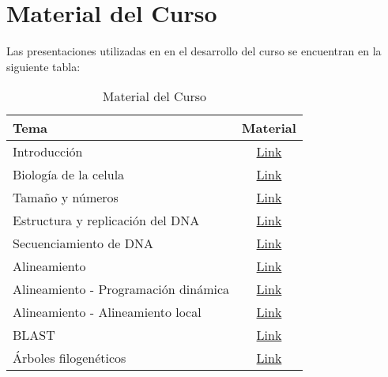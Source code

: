 \chapter{Material del Curso}
\newpage
\pagestyle{empty} %

Las presentaciones utilizadas en en el desarrollo del curso se encuentran en la siguiente tabla:

\begin{table}[h]
\centering
\begin{tabular}{l|c}
\hline
\textbf{Tema} & 
\textbf{Material} 
\\ \hline
Introducción &
\href{https://drive.google.com/drive/folders/18yP-CM04srt3JQ-4ImnSsoB3DI4GWFAp?usp=sharing}{Link}
\\ \hline
Biología de la celula &
 \href{https://drive.google.com/drive/folders/18yP-CM04srt3JQ-4ImnSsoB3DI4GWFAp?usp=sharing}{Link}
\\ \hline
Tamaño y números &
\href{https://drive.google.com/drive/folders/18yP-CM04srt3JQ-4ImnSsoB3DI4GWFAp?usp=sharing}{Link}
\\ \hline
Estructura y replicación del DNA &
\href{https://drive.google.com/drive/folders/18yP-CM04srt3JQ-4ImnSsoB3DI4GWFAp?usp=sharing}{Link}
\\ \hline
Secuenciamiento de DNA &
\href{https://drive.google.com/drive/folders/18yP-CM04srt3JQ-4ImnSsoB3DI4GWFAp?usp=sharing}{Link}
\\ \hline
Alineamiento &
\href{https://drive.google.com/drive/folders/18yP-CM04srt3JQ-4ImnSsoB3DI4GWFAp?usp=sharing}{Link}
\\ \hline
Alineamiento - Programación dinámica &
\href{https://drive.google.com/drive/folders/18yP-CM04srt3JQ-4ImnSsoB3DI4GWFAp?usp=sharing}{Link}
\\ \hline
Alineamiento - Alineamiento local &
\href{https://drive.google.com/drive/folders/18yP-CM04srt3JQ-4ImnSsoB3DI4GWFAp?usp=sharing}{Link}
\\ \hline
BLAST &
\href{https://drive.google.com/drive/folders/18yP-CM04srt3JQ-4ImnSsoB3DI4GWFAp?usp=sharing}{Link}
\\ \hline
Árboles filogenéticos &
\href{https://drive.google.com/drive/folders/18yP-CM04srt3JQ-4ImnSsoB3DI4GWFAp?usp=sharing}{Link}
\\ \hline
\end{tabular}
\caption{Material del Curso}
\label{tab:material_curso} %
\end{table}
